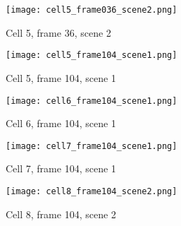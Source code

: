 \begin{figure}[H]
\centering
  \texttt{[image: cell5\_frame036\_scene2.png]}
  \caption{Cell 5, frame 36, scene 2}
  \label{img:cell5_frame036_scene2}
\end{figure}

\begin{figure}[H]
\centering
  \texttt{[image: cell5\_frame104\_scene1.png]}
  \caption{Cell 5, frame 104, scene 1}
  \label{img:cell5_frame104_scene1}
\end{figure}

\begin{figure}[H]
\centering
  \texttt{[image: cell6\_frame104\_scene1.png]}
  \caption{Cell 6, frame 104, scene 1}
  \label{img:cell6_frame104_scene1}
\end{figure}

\begin{figure}[H]
\centering
  \texttt{[image: cell7\_frame104\_scene1.png]}
  \caption{Cell 7, frame 104, scene 1}
  \label{img:cell7_frame104_scene1}
\end{figure}

\begin{figure}[H]
\centering
  \texttt{[image: cell8\_frame104\_scene2.png]}
  \caption{Cell 8, frame 104, scene 2}
  \label{img:cell8_frame104_scene2}
\end{figure}
